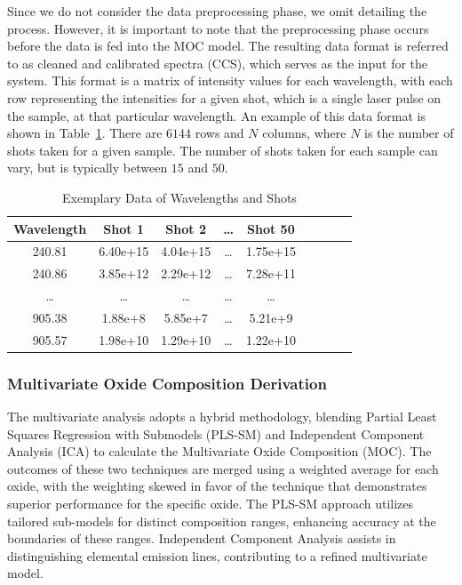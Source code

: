 Since we do not consider the data preprocessing phase, we omit detailing the process. However, it is important to note that the preprocessing phase occurs before the data is fed into the MOC model.
The resulting data format is referred to as cleaned and calibrated spectra (CCS), which serves as the input for the system.
This format is a matrix of intensity values for each wavelength, with each row representing the intensities for a given shot, which is a single laser pulse on the sample, at that particular wavelength. An example of this data format is shown in Table~\ref{tab:example_data}. There are $6144$ rows and $N$ columns, where $N$ is the number of shots taken for a given sample. The number of shots taken for each sample can vary, but is typically between $15$ and $50$.

\begin{table}[ht]
\centering
\caption{Exemplary Data of Wavelengths and Shots}
\label{tab:example_data}
\begin{tabular}{|c|c|c|c|c|c|c|c|c|}
\hline
Wavelength & Shot 1   & Shot 2 & \ldots & Shot 50  \\ \hline
240.81     & 6.40e+15 & 4.04e+15 & \ldots& 1.75e+15 \\ \hline
240.86     & 3.85e+12 & 2.29e+12& \ldots & 7.28e+11 \\ \hline
\ldots     & \ldots & \ldots & \ldots & \ldots \\ \hline
905.38     & 1.88e+8 & 5.85e+7 & \ldots & 5.21e+9 \\ \hline
905.57     & 1.98e+10 & 1.29e+10& \ldots & 1.22e+10 \\ \hline
\end{tabular}
\end{table}



\subsubsection{Multivariate Oxide Composition Derivation}\label{sec:moc_derivation}
The multivariate analysis adopts a hybrid methodology, blending Partial Least Squares Regression with Submodels (PLS-SM) and Independent Component Analysis (ICA) to calculate the Multivariate Oxide Composition (MOC).
The outcomes of these two techniques are merged using a weighted average for each oxide, with the weighting skewed in favor of the technique that demonstrates superior performance for the specific oxide.
The PLS-SM approach utilizes tailored sub-models for distinct composition ranges, enhancing accuracy at the boundaries of these ranges.
Independent Component Analysis assists in distinguishing elemental emission lines, contributing to a refined multivariate model.

